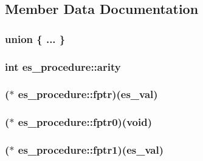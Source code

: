 \subsection{Member Data Documentation}
\hypertarget{structes__procedure_a8a1721ee12dc098606e09264d1e4c315}{\subsubsection[{"@1}]{\setlength{\rightskip}{0pt plus 5cm}union \{ ... \} }}\label{structes__procedure_a8a1721ee12dc098606e09264d1e4c315}
\hypertarget{structes__procedure_ade1ceee2df36b536b22cfcad392cae84}{
\subsubsection[{arity}]{\setlength{\rightskip}{0pt plus 5cm}int es\-\_\-procedure\-::arity}}\label{structes__procedure_ade1ceee2df36b536b22cfcad392cae84}
\hypertarget{structes__procedure_a8c00df37f857b9974da7971d49e2a159}{
\subsubsection[{fptr}]{($\ast$ es\-\_\-procedure\-::fptr)({\bf es\-\_\-val})}}\label{structes__procedure_a8c00df37f857b9974da7971d49e2a159}
\hypertarget{structes__procedure_a0e0af42ca23c499c4eac0631385069e9}{
\subsubsection[{fptr0}]{($\ast$ es\-\_\-procedure\-::fptr0)(void)}}\label{structes__procedure_a0e0af42ca23c499c4eac0631385069e9}
\hypertarget{structes__procedure_a93510ec0977c4b1448c9ffa2f5a3e58a}{
\subsubsection[{fptr1}]{($\ast$ es\-\_\-procedure\-::fptr1)({\bf es\-\_\-val})}}\label{structes__procedure_a93510ec0977c4b1448c9ffa2f5a3e58a}
